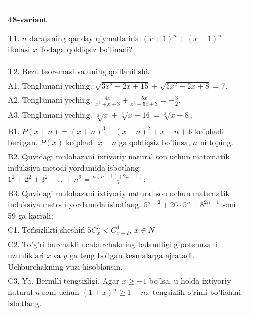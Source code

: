 \documentclass{article}
\begin{document}
\begin{tabular}{m{17cm}}
\textbf{48-variant}
\newline

T1. \(n\) darajaning qanday qiymatlarida \((x + 1)^{n} + (x - 1)^{n}\) ifodasi \(x\) ifodaga qoldiqsiz bo'linadi? \\
T2. Bezu teoremasi va uning qo'llanilishi. \\
A1. Tenglamani yeching. \(\sqrt{3x^{2} - 2x + 15} + \sqrt{3x^{2} - 2x + 8} = 7\). \\
A2. Tenglamani yeching. \(\frac{4x}{x^{2} + x + 3} + \frac{5x}{x^{2} - 5x + 3} = - \frac{3}{2}\). \\
A3. Tenglamani yeching. \(\sqrt[3]{x} + \sqrt[3]{x - 16} = \sqrt[3]{x - 8}\). \\
B1. \(P(x + n) = (x + n)^{3} + (x - n)^{2} + x + n + 6\) ko'phadi berilgan. \(P(x)\) ko'phadi \(x - n\) ga qoldiqsiz bo'linsa, \(n\) ni toping. \\
B2. Quyidagi mulohazani ixtiyoriy natural son uchun matematik induksiya metodi yordamida isbotlang: \(1^{2} + 2^{2} + 3^{2} + ... + n^{2} = \frac{n(n + 1)(2n + 1)}{6}\); \\
B3. Quyidagi mulohazani ixtiyoriy natural son uchun matematik induksiya metodi yordamida isbotlang: \(5^{n + 2} + 26 \cdot 5^{n} + 8^{2n + 1}\) soni 59 ga karrali; \\
C1. Teńsizlikti sheshiń \(5C_{x}^{3} < C_{x + 2}^{4}\), \(x \in N\) \\
C2. To'g'ri burchakli uchburchakning balandligi gipotenuzani uzunliklari \emph{x} va \emph{y} ga teng bo'lgan kesmalarga ajratadi. Uchburchakning yuzi hisoblansin. \\
C3. Ya. Bermlli tengsizligi. Agar \(x \geq - 1\) bo'lsa, u holda ixtiyoriy natural \(n\) soni uchun \((1 + x)^{n} \geq 1 + nx\) tengsizlik o'rinli bo'lishini isbotlang. \\

\end{tabular}
\vspace{1cm}
\end{document}
